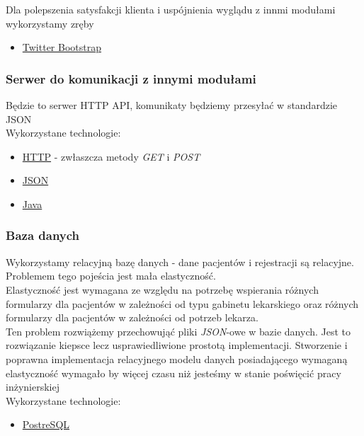 \documentclass[polish,12pt]{aghthesis}
\begin{document}
Dla polepszenia satysfakcji klienta i uspójnienia wyglądu z innmi modułami wykorzystamy zręby
\begin{itemize}
  \item \href{https://getbootstrap.com/}{Twitter Bootstrap}
\end{itemize}

\subsubsection{Serwer do komunikacji z innymi modułami}
Będzie to serwer HTTP API, komunikaty będziemy przesyłać w standardzie JSON \\
Wykorzystane technologie:
\begin{itemize}
  \item \href{https://pl.wikipedia.org/wiki/Hypertext_Transfer_Protocol}{HTTP} - zwłaszcza metody \emph{GET} i \emph{POST}
  \item \href{http://www.json.org/}{JSON}
  \item \href{https://www.oracle.com/java/index.html}{Java}
\end{itemize}

\subsubsection{Baza danych}
\label{subsec:wykorzystane-technologie-baza}
Wykorzystamy relacyjną bazę danych - dane pacjentów i rejestracji są relacyjne. Problemem tego pojeścia jest mała elastyczność. \\
Elastyczność jest wymagana ze względu na potrzebę wspierania różnych formularzy dla pacjentów w zależności od typu gabinetu lekarskiego oraz różnych formularzy dla pacjentów w zależności od potrzeb lekarza. \\
Ten problem rozwiążemy przechowująć pliki \emph{JSON}-owe w bazie danych. Jest to rozwiązanie kiepsce lecz usprawiedliwione prostotą implementacji. Stworzenie i poprawna implementacja relacyjnego modelu danych posiadającego wymaganą elastyczność wymagało by więcej czasu niż jesteśmy w stanie poświęcić pracy inżynierskiej \\
Wykorzystane technologie:
\begin{itemize}
  \item \href{https://www.postgresql.org/}{PostreSQL}
\end{itemize}


\end{document}
